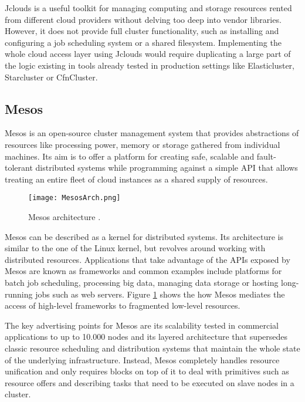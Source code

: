 Jclouds is a useful toolkit for managing computing and storage resources rented from different cloud providers without delving too deep into vendor libraries. However, it does not provide full cluster functionality, such as installing and configuring a job scheduling system or a shared filesystem. Implementing the whole cloud access layer using Jclouds would require duplicating a large part of the logic existing in tools already tested in production settings like Elasticluster, Starcluster or CfnCluster.

\subsection{Mesos}

Mesos \cite{Mesos} is an open-source cluster management system that provides abstractions of resources like processing power, memory or storage gathered from individual machines. Its aim is to offer a platform for creating safe, scalable and fault-tolerant distributed systems while programming against a simple API that allows treating an entire fleet of cloud instances as a shared supply of resources.

\begin{figure}[H]
	\centering
		\texttt{[image: MesosArch.png]}
	\caption{Mesos architecture \cite{MesosArch}.}
	\label{MesosArch}
\end{figure}

Mesos can be described as a kernel for distributed systems. Its architecture is similar to the one of the Linux kernel, but revolves around working with distributed resources. Applications that take advantage of the APIs exposed by Mesos are known as frameworks and common examples include platforms for batch job scheduling, processing big data, managing data storage or hosting long-running jobs such as web servers. Figure \ref{MesosArch} shows the how Mesos mediates the access of high-level frameworks to fragmented low-level resources.

The key advertising points for Mesos are its scalability tested in commercial applications to up to 10.000 nodes and its layered architecture that supersedes classic resource scheduling and distribution systems that maintain the whole state of the underlying infrastructure. Instead, Mesos completely handles resource unification and only requires blocks on top of it to deal with primitives such as resource offers and describing tasks that need to be executed on slave nodes in a cluster.

